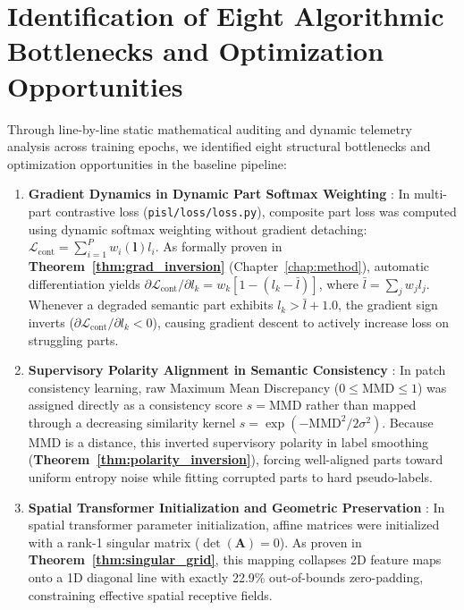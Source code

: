 \section{Identification of Eight Algorithmic Bottlenecks and Optimization Opportunities}
\label{sec:eight_pathologies}

Through line-by-line static mathematical auditing and dynamic telemetry analysis across training epochs, we identified eight structural bottlenecks and optimization opportunities in the baseline pipeline:

\begin{enumerate}[itemsep=0.5pt,parsep=0pt,topsep=1.0pt,leftmargin=*]
    \item \textbf{Gradient Dynamics in Dynamic Part Softmax Weighting} \label{subsec:path1}:
    In multi-part contrastive loss (\texttt{pisl/loss/loss.py}), composite part loss was computed using dynamic softmax weighting without gradient detaching: $\mathcal{L}_{\text{cont}} = \sum_{i=1}^P w_i(\mathbf{l}) l_i$. As formally proven in \textbf{Theorem~\ref{thm:grad_inversion}} (Chapter~\ref{chap:method}), automatic differentiation yields $\partial \mathcal{L}_{\text{cont}} / \partial l_k = w_k [ 1 - (l_k - \bar{l}) ]$, where $\bar{l} = \sum_{j} w_j l_j$. Whenever a degraded semantic part exhibits $l_k > \bar{l} + 1.0$, the gradient sign inverts ($\partial \mathcal{L}_{\text{cont}} / \partial l_k < 0$), causing gradient descent to actively increase loss on struggling parts.

    \item \textbf{Supervisory Polarity Alignment in Semantic Consistency} \label{subsec:path2}:
    In patch consistency learning, raw Maximum Mean Discrepancy ($0 \le \text{MMD} \le 1$) was assigned directly as a consistency score $s = \text{MMD}$ rather than mapped through a decreasing similarity kernel $s = \exp(-\text{MMD}^2 / 2\sigma^2)$. Because MMD is a distance, this inverted supervisory polarity in label smoothing (\textbf{Theorem~\ref{thm:polarity_inversion}}), forcing well-aligned parts toward uniform entropy noise while fitting corrupted parts to hard pseudo-labels.

    \item \textbf{Spatial Transformer Initialization and Geometric Preservation} \label{subsec:path3}:
    In spatial transformer parameter initialization, affine matrices were initialized with a rank-1 singular matrix ($\det(\mathbf{A}) = 0$). As proven in \textbf{Theorem~\ref{thm:singular_grid}}, this mapping collapses 2D feature maps onto a 1D diagonal line with exactly 22.9\% out-of-bounds zero-padding, constraining effective spatial receptive fields.


\end{enumerate}
